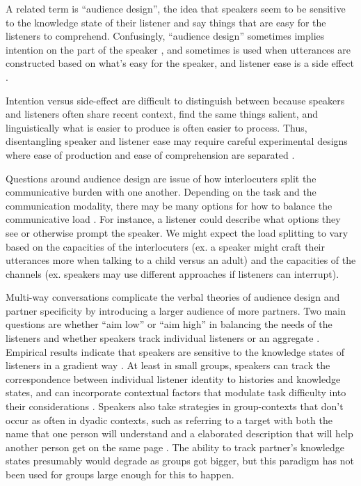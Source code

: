 \documentclass[]{article}
\begin{document}
A related term is ``audience design'', the idea that speakers seem to be sensitive to the knowledge state of their listener and say things that are easy for the listeners to comprehend. Confusingly, ``audience design'' sometimes implies intention on the part of the speaker \citep{horton2002a, horton2005}, and sometimes is used when utterances are constructed based on what's easy for the speaker, and listener ease is a side effect \cite{horton1996, rogers2013, macdonald2013}.

  Intention versus side-effect are difficult to distinguish between because speakers and listeners often share recent context, find the same things salient, and linguistically what is easier to produce is often easier to process. Thus, disentangling speaker and listener ease may require careful experimental designs where ease of production and ease of comprehension are separated \citep{ferreira2004}. 
  
Questions around audience design are issue of how interlocuters split the communicative burden with one another. Depending on the task and the communication modality, there may be many options for how to balance the communicative load  \citep{clark1996, fay2010, foxtree2013, TODO}. For instance, a listener could describe what options they see or otherwise prompt the speaker. We might expect the load splitting to vary based on the capacities of the interlocuters (ex. a speaker might craft their utterances more when talking to a child versus an adult) and the capacities of the channels (ex. speakers may use different approaches if listeners can interrupt). 

Multi-way conversations complicate the verbal theories of audience design and partner specificity by introducing a larger audience of more partners. Two main questions are whether ``aim low'' or ``aim high'' in balancing the needs of the listeners and whether speakers track individual listeners or an aggregate \cite{yoon2014}. Empirical results indicate that speakers are sensitive to the knowledge states of listeners in a gradient way \citep{yoon2014, yoon2018, yoon2019}. At least in small groups, speakers can track the correspondence between individual listener identity to histories and knowledge states, and can incorporate contextual factors that modulate task difficulty into their considerations \citep{yoon2019a}. Speakers also take strategies in group-contexts that don't occur as often in dyadic contexts, such as referring to a target with both the name that one person will understand and a elaborated description that will help another person get on the same page \citep{yoon2018}. The ability to track partner's knowledge states presumably would degrade as groups got bigger, but this paradigm has not been used for groups large enough for this to happen. 
\end{document}
